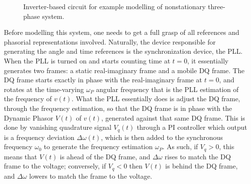\begin{example}
\begin{figure}[htb!]
	\caption{Inverter-based circuit for example modelling of nonstationary three-phase system.}
	\label{fig:ibr_modelling_example}
\end{figure} %

	Before modelling this system, one needs to get a full grasp of all references and phasorial representations involved. Naturally, the device responsible for generating the angle and time references is the synchronization device, the PLL. When the PLL is turned on and starts counting time at $t=0$, it essentially generates two frames: a static real-imaginary frame and a mobile DQ frame. The DQ frame starts exactly in phase with the real-imaginary frame at $t=0$, and rotates at the time-varying $\omega_P$ angular frequency that is the PLL estimation of the frequency of $v(t)$. What the PLL essentially does is adjust the DQ frame, through the frequency estimation, so that the DQ frame is in phase with the Dynamic Phasor $V(t)$ of $v(t)$, generated against that same DQ frame. This is done by vanishing quadrature signal $V_q(t)$ through a PI controller which output is a frequency deviation $\Delta\omega(t)$, which is then added to the synchronous frequency $\omega_0$ to generate the frequency estimation $\omega_P$. As such, if $V_q > 0$, this means that $V(t)$ is ahead of the DQ frame, and $\Delta\omega$ rises to match the DQ frame to the voltage; conversely, if $V_q < 0$ then $V(t)$ is behind the DQ frame, and $\Delta\omega$ lowers to match the frame to the voltage.


\end{example}
